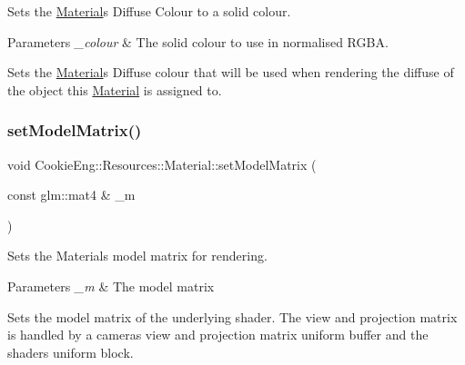 Sets the \hyperlink{class_cookie_eng_1_1_resources_1_1_material}{Material}\textquotesingle{}s Diffuse Colour to a solid colour. 


\begin{DoxyParams}{Parameters}
{\em \+\_\+colour} & The solid colour to use in normalised R\+G\+BA.\\
\hline
\end{DoxyParams}
Sets the \hyperlink{class_cookie_eng_1_1_resources_1_1_material}{Material}\textquotesingle{}s Diffuse colour that will be used when rendering the diffuse of the object this \hyperlink{class_cookie_eng_1_1_resources_1_1_material}{Material} is assigned to. \mbox{\label{class_cookie_eng_1_1_resources_1_1_material_ab0155fcca9b954c1661b02e01ab9e06d}} 
\subsubsection{\texorpdfstring{set\+Model\+Matrix()}{setModelMatrix()}}
{\footnotesize\ttfamily void Cookie\+Eng\+::\+Resources\+::\+Material\+::set\+Model\+Matrix (\begin{DoxyParamCaption}\item[{const glm\+::mat4 \&}]{\+\_\+m }\end{DoxyParamCaption})}



Sets the Materials model matrix for rendering. 


\begin{DoxyParams}{Parameters}
{\em \+\_\+m} & The model matrix\\
\hline
\end{DoxyParams}
Sets the model matrix of the underlying shader. The view and projection matrix is handled by a camera\textquotesingle{}s view and projection matrix uniform buffer and the shaders uniform block. \mbox{\label{class_cookie_eng_1_1_resources_1_1_material_a55455e741fb79ffd11be29967097709c}} 
